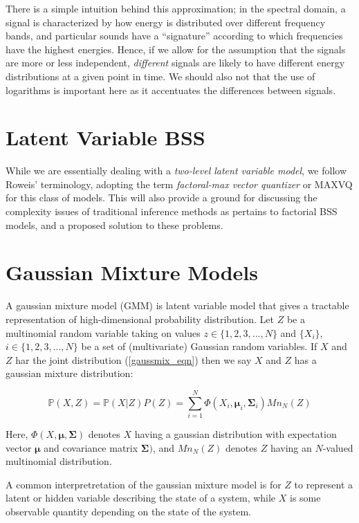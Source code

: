 \documentclass[11pt, oneside, a4paper]{report}
\begin{document}
There is a simple intuition behind this approximation; in the spectral domain, a signal is characterized
by how energy is distributed over different frequency bands, and particular sounds have a ``signature''
according to which frequencies have the highest energies. Hence, if we allow for the assumption that
the signals are more or less independent, \emph{different} signals are likely to have different energy 
distributions at a given point in time. We should also not that the use of logarithms is important here as 
it accentuates the differences between signals.


\section{Latent Variable BSS}

While we are essentially dealing with a \emph{two-level latent variable model}, we follow
Roweis' terminology, adopting the term \emph{factoral-max vector quantizer} or MAXVQ for 
this class of models. This will also provide a ground for discussing the complexity issues
of traditional inference methods as pertains to factorial BSS models, and a proposed solution
to these problems.



\section{Gaussian Mixture Models}\label{gmm_appendix}
A gaussian mixture model (GMM) is latent variable model that gives a
tractable representation of high-dimensional probability
distribution. Let $Z$ be a multinomial random variable taking on
values $z \in \{1,2,3,...,N\}$ and $\{X_i\}$, $i \in \{1,2,3,...,N\}$
be a set of (multivariate) Gaussian random variables. If $X$ and $Z$
har the joint distribution (\ref{gaussmix_eqn}) then we say $X$ and $Z$
has a gaussian mixture distribution:

\begin{equation}\label{gaussmix_eqn}
  \mathbb{P}(X,Z) = \mathbb{P}(X|Z)P(Z) = \sum_{i = 1}^N
  \Phi(X_i,\mathbf{\mu}_i, \mathbf{\Sigma}_i)Mn_N(Z)
\end{equation}

Here, $\Phi(X,\mathbf{\mu}, \mathbf{\Sigma})$ denotes $X$ having a
gaussian distribution with expectation vector $\mathbf{\mu}$ and
covariance matrix $\mathbf{\Sigma})$, and $Mn_N(Z)$ denotes $Z$ having
an $N$-valued multinomial distribution.

A common interpretretation of the gaussian mixture model is for $Z$ to
represent a latent or hidden variable describing the state of a
system, while $X$ is some observable quantity depending on the state
of the system. 
\end{document}
